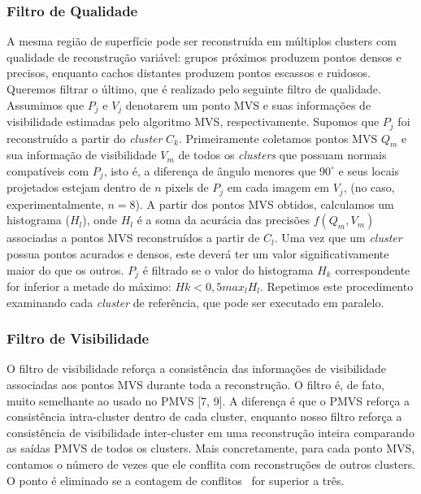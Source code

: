 \begin{itemize}
\subsubsection*{Filtro de Qualidade}

A mesma região de superfície pode ser reconstruída em múltiplos clusters com qualidade de reconstrução variável: grupos próximos produzem pontos densos e precisos, enquanto cachos distantes produzem pontos escassos e ruidosos. Queremos filtrar o último, que é realizado pelo seguinte filtro de qualidade. Assumimos que $P_j$ e $V_j$ denotarem um ponto MVS e suas informações de visibilidade estimadas pelo algoritmo MVS, respectivamente. Supomos que $P_j$ foi reconstruído a partir do \emph{cluster} $C_k$. Primeiramente coletamos pontos MVS ${Q_m}$ e sua informação de visibilidade ${V_m}$ de todos os \emph{clusters} que possuam normais compatíveis com $P_j$, isto é, a diferença de ângulo menores que $90^\circ$ e seus locais projetados estejam dentro de $n$ pixels de $P_j$ em cada imagem em $V_j$, (no caso, experimentalmente, $n=8$). A partir dos pontos MVS obtidos, calculamos um histograma ($H_l$), onde $H_l$ é a soma da acurácia das precisões $f(Q_m,V_m)$ associadas a pontos MVS reconstruídos a partir de $C_l$. Uma vez que um \emph{cluster} possua pontos acurados e densos, este deverá ter um valor significativamente maior do que os outros. $P_j$ é filtrado se o valor do histograma $H_k$ correspondente for inferior a metade do máximo: $Hk < 0,5 max_l H_l$. Repetimos este procedimento examinando cada \emph{cluster} de referência, que pode ser executado em paralelo. 

\subsubsection*{Filtro de Visibilidade}

O filtro de visibilidade reforça a consistência das informações de visibilidade associadas aos pontos MVS durante toda a reconstrução. O filtro é, de fato, muito semelhante ao usado no PMVS [7, 9]. A diferença é que o PMVS reforça a consistência intra-cluster dentro de cada cluster, enquanto nosso filtro reforça a consistência de visibilidade inter-cluster em uma reconstrução inteira comparando as saídas PMVS de todos os clusters. Mais concretamente, para cada ponto MVS, contamos o número de vezes que ele conflita com reconstruções de outros clusters. O ponto é eliminado se a contagem de conflitos~\cite{furukawa2010towards,furukawa2010accurate} for superior a três.

\end{itemize}

